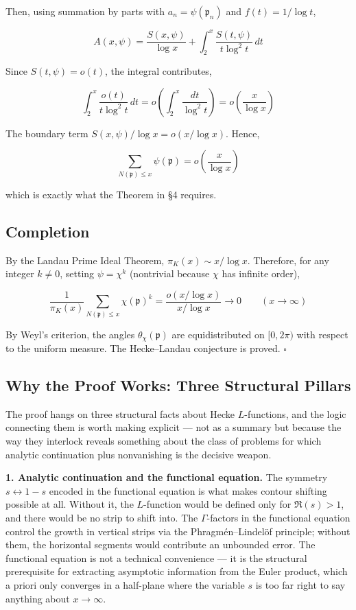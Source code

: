\documentclass[12pt,a4paper]{article}
\newcommand{\pilcrow}{\S}
\begin{document}
Then, using summation by parts with $a_n = \psi(\mathfrak{p}_n)$ and $f(t) = 1/\log t$,

\[
A(x, \psi) = \frac{S(x, \psi)}{\log x} + \int_2^x \frac{S(t, \psi)}{t \log^2 t} \, dt
\]

Since $S(t, \psi) = o(t)$, the integral contributes,

\[
\int_2^x \frac{o(t)}{t \log^2 t} \, dt = o\!\left(\int_2^x \frac{dt}{\log^2 t}\right) = o\!\left(\frac{x}{\log x}\right)
\]

The boundary term $S(x, \psi)/\log x = o(x/\log x)$. Hence,

\[
\sum_{N(\mathfrak{p}) \leq x} \psi(\mathfrak{p}) = o\!\left(\frac{x}{\log x}\right)
\]

which is exactly what the Theorem in \pilcrow{}4 requires.

\subsection{Completion}

By the Landau Prime Ideal Theorem, $\pi_K(x) \sim x/\log x$. Therefore, for any integer $k \neq 0$, setting $\psi = \chi^k$ (nontrivial because $\chi$ has infinite order),

\[
\frac{1}{\pi_K(x)} \sum_{N(\mathfrak{p}) \leq x} \chi(\mathfrak{p})^k = \frac{o(x/\log x)}{x/\log x} \to 0 \qquad (x \to \infty)
\]

By Weyl's criterion, the angles $\theta_{\chi}(\mathfrak{p})$ are equidistributed on $[0, 2\pi)$ with respect to the uniform measure. The Hecke--Landau conjecture is proved. $\square$

\subsection{Why the Proof Works: Three Structural Pillars}

The proof hangs on three structural facts about Hecke $L$-functions, and the logic connecting them is worth making explicit --- not as a summary but because the way they interlock reveals something about the class of problems for which analytic continuation plus nonvanishing is the decisive weapon.

\textbf{1. Analytic continuation and the functional equation.} The symmetry $s \leftrightarrow 1-s$ encoded in the functional equation is what makes contour shifting possible at all. Without it, the $L$-function would be defined only for $\Re(s) > 1$, and there would be no strip to shift into. The $\Gamma$-factors in the functional equation control the growth in vertical strips via the Phragmén--Lindelöf principle; without them, the horizontal segments would contribute an unbounded error. The functional equation is not a technical convenience --- it is the structural prerequisite for extracting asymptotic information from the Euler product, which a priori only converges in a half-plane where the variable $s$ is too far right to say anything about $x \to \infty$.
\end{document}
